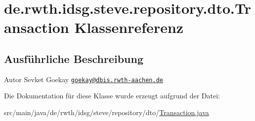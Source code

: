 \hypertarget{classde_1_1rwth_1_1idsg_1_1steve_1_1repository_1_1dto_1_1_transaction}{\section{de.\+rwth.\+idsg.\+steve.\+repository.\+dto.\+Transaction Klassenreferenz}
\label{classde_1_1rwth_1_1idsg_1_1steve_1_1repository_1_1dto_1_1_transaction}
}


\subsection{Ausführliche Beschreibung}
\begin{DoxyAuthor}{Autor}
Sevket Goekay \href{mailto:goekay@dbis.rwth-aachen.de}{\tt goekay@dbis.\+rwth-\/aachen.\+de} 
\end{DoxyAuthor}


Die Dokumentation für diese Klasse wurde erzeugt aufgrund der Datei\+:\begin{DoxyCompactItemize}
\item 
src/main/java/de/rwth/idsg/steve/repository/dto/\hyperlink{_transaction_8java}{Transaction.\+java}\end{DoxyCompactItemize}
